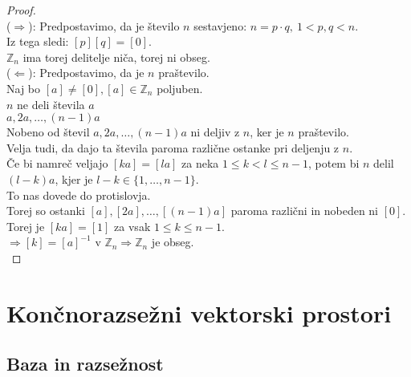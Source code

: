 \documentclass[a4paper,12pt]{article}
\begin{document}
\begin{proof} ~\\

($\Rightarrow$): Predpostavimo, da je število $n$ sestavjeno: $n=p\cdot q,~1<p,q<n$. \\

\noindent Iz tega sledi: $[p][q]=[0]$. \\

\noindent $\mathbb{Z}_n$ ima torej delitelje niča, torej ni obseg.\\

($\Leftarrow$): Predpostavimo, da je $n$ praštevilo. \\

\noindent Naj bo $[a]\neq [0],[a]\in \mathbb{Z}_n$ poljuben. \\

\noindent $n$ ne deli števila $a$ \\

\noindent $a,2a,\ldots,(n-1)a$ \\

\noindent Nobeno od števil $a,2a,\ldots,(n-1)a$ ni deljiv z $n$, ker je $n$ praštevilo. \\

Velja tudi, da dajo ta števila paroma različne ostanke pri deljenju z $n$. \\

Če bi namreč veljajo $[ka]=[la]$ za neka $1\leq k < l \leq n-1$, potem bi $n$ delil $(l-k)a$, kjer je $l-k\in \{1,\ldots,n-1\}$. \\

To nas dovede do protislovja.\\

\noindent Torej so ostanki $[a],[2a],\ldots,[(n-1)a]$ paroma različni in nobeden ni $[0]$. \\

Torej je $[ka]=[1]$ za vsak $1\leq k \leq n-1$. \\

\noindent $\Rightarrow [k]=[a]^{-1}$ v $\mathbb{Z}_n \Rightarrow \mathbb{Z}_n$ je obseg.\\
\end{proof}
\newpage

\section{Končnorazsežni vektorski prostori}

\subsection{Baza in razsežnost}
\end{document}
